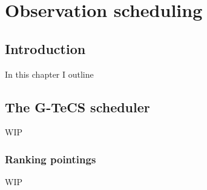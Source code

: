 \chapter{Observation scheduling}
\label{chap:scheduling}
\chaptoc{}


\newpage
\section{Introduction}
\label{sec:scheduling_intro}
\begin{colsection}


\begin{colsection}

In this chapter I outline 

\end{colsection}


\end{colsection}


\newpage
\section{The G-TeCS scheduler}
\label{sec:the_scheduler}
\begin{colsection}


\begin{colsection}

WIP

\end{colsection}


\subsection{Ranking pointings}
\label{sec:ranking}
\begin{colsection}

WIP

\end{colsection}

\end{colsection}


